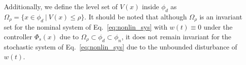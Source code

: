 \documentclass[letterpaper, 10pt, conference]{ieeeconf}
\begin{document}
	
	
	
	Additionally, we define the level set of $V(x)$ inside $\phi_d$ as $\Omega_\rho= \{ x \in \phi_d   ~|~ V(x) \leq \rho \}$. It should be noted that although $\Omega_{\rho}$ is an invariant set for the nominal system of Eq.~\ref{eq:nonlin_sys} with $w(t) \equiv 0$ under the controller $\Phi_s(x)$ due to $\Omega_{\rho} \subset \phi_d \subset \phi_n$, it does not remain invariant for the stochastic system of Eq.~\ref{eq:nonlin_sys} due to the unbounded disturbance of $w(t)$.
	
	
	
	
\end{document}
